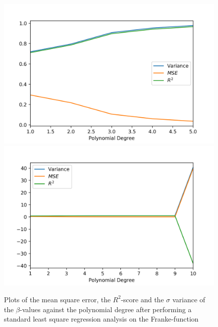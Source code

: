 \documentclass[a4paper,10pt,english]{article}
\begin{document}
\begin{figure}[H]
	\centering 
	\includegraphics[scale=0.63]{../franke_output/part_A.png}
	\includegraphics[scale=0.63]{../franke_output/part_A_highdeg.png}
	\caption{
		Plots of the mean square error, the $R^2$-score and the $\sigma$ variance of the $\beta$-values against the polynomial degree after performing a standard least square regression analysis on the Franke-function
	}
	\label{part_a}
\end{figure}
\end{document}
